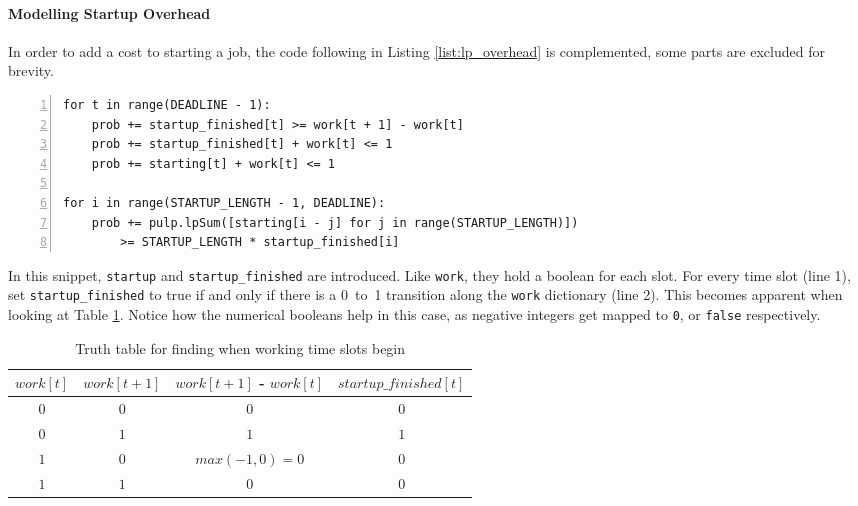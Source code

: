 \newpage
\paragraph{Modelling Startup Overhead}

In order to add a cost to starting a job, the code following in Listing \ref{list:lp_overhead} is complemented, some parts are excluded for brevity.

\begin{minipage}{\linewidth} %
\begin{lstlisting}[frame=single, numbers=left, caption={LP Implementation for overhead}, label={list:lp_overhead}, basicstyle=\ttfamily]
for t in range(DEADLINE - 1):
    prob += startup_finished[t] >= work[t + 1] - work[t]
    prob += startup_finished[t] + work[t] <= 1
    prob += starting[t] + work[t] <= 1

for i in range(STARTUP_LENGTH - 1, DEADLINE):
    prob += pulp.lpSum([starting[i - j] for j in range(STARTUP_LENGTH)]) 
        >= STARTUP_LENGTH * startup_finished[i]
\end{lstlisting}
\end{minipage}

In this snippet, \verb|startup| and \verb|startup_finished| are introduced. 
Like \verb|work|, they hold a boolean for each slot.
For every time slot (line 1), set \verb|startup_finished| to true if and only if there is a 0~to~1 transition along the \verb|work| dictionary (line 2). This becomes apparent when looking at Table \ref{tab:truth_table_startup_finished}.
Notice how the numerical booleans help in this case, as negative integers get mapped to \verb|0|, or \verb|false| respectively.

\begin{table}[h!]
\centering
\begin{tabular}{|c|c|c|c|}
\hline
    $work[t]$ & $work[t+1]$ & $work[t+1]$ - $work[t]$ & $startup\_finished[t]$ \\ \hline
    $0$ & $0$ & $0$ & $0$ \\ \hline
    $0$ & $1$ & $1$ & $1$ \\ \hline
    $1$ & $0$ & $max(-1, 0) = 0$ & $0$ \\ \hline
    $1$ & $1$ & $0$ & $0$ \\ \hline
\end{tabular}
\caption{Truth table for finding when working time slots begin}
\label{tab:truth_table_startup_finished}
\end{table}

